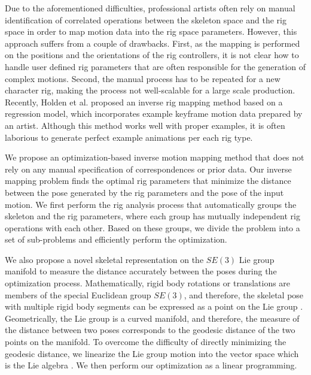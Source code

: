 Due to the aforementioned difficulties, professional artists often rely on manual identification of correlated operations between the skeleton space and the rig space in order to map motion data into the rig space parameters\cite{palamar2013mastering,DigitalTutor2013}. However, this approach suffers from a couple of drawbacks. First, as the mapping is performed on the positions and the orientations of the rig controllers, it is not clear how to handle user defined rig parameters that are often responsible for the generation of complex motions. Second, the manual process has to be repeated for a new character rig, making the process not well-scalable for a large scale production. Recently, Holden et al. proposed an inverse rig mapping method based on a regression model, which incorporates example keyframe motion data prepared by an artist. Although this method works well with proper examples, it is often laborious to generate perfect example animations per each rig type.

We propose an optimization-based inverse motion mapping method that does not rely on any manual specification of correspondences or prior data. Our inverse mapping problem finds the optimal rig parameters that minimize the distance between the pose generated by the rig parameters and the pose of the input motion. We first perform the rig analysis process that automatically groups the skeleton and the rig parameters, where each group has mutually independent rig operations with each other. Based on these groups, we divide the problem into a set of sub-problems and efficiently perform the optimization.

We also propose a novel skeletal representation on the $SE(3)$ Lie group manifold to measure the distance accurately between the poses during the optimization process. Mathematically, rigid body rotations or translations are members of the special Euclidean group $SE(3)$\cite{murray1994mathematical}, and therefore, the skeletal pose with multiple rigid body segments can be expressed as a point on the Lie group \SE. Geometrically, the Lie group \SE{} is a curved manifold, and therefore, the measure of the distance between two poses corresponds to the geodesic distance of the two points on the manifold. To overcome the difficulty of directly minimizing the geodesic distance, we linearize the Lie group \SE{} motion into the vector space which is the Lie algebra \se{}. We then perform our optimization as a linear programming.

